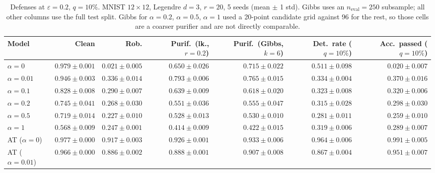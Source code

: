 \begin{table}[htbp]
  \centering
  \small
  \begin{tabular}{@{}lrrrrrr@{}}
    \toprule
    Model & Clean & Rob. & Purif.\ (lk., $r{=}0.2$) & Purif.\ (Gibbs, $k{=}6$) & Det.\ rate ($q{=}10\%$) & Acc.\ passed ($q{=}10\%$) \\
    \midrule
    $\alpha{=}0$ & $\mathbf{0.979 \pm 0.001}$ & $0.021 \pm 0.005$ & $0.650 \pm 0.026$ & $0.715 \pm 0.022$ & $0.511 \pm 0.098$ & $0.020 \pm 0.007$ \\
    $\alpha{=}0.01$ & $0.946 \pm 0.003$ & $0.336 \pm 0.014$ & $0.793 \pm 0.006$ & $0.765 \pm 0.015$ & $0.334 \pm 0.004$ & $0.370 \pm 0.016$ \\
    $\alpha{=}0.1$ & $0.828 \pm 0.008$ & $0.290 \pm 0.007$ & $0.639 \pm 0.009$ & $0.618 \pm 0.020$ & $0.323 \pm 0.008$ & $0.320 \pm 0.006$ \\
    $\alpha{=}0.2$ & $0.745 \pm 0.041$ & $0.268 \pm 0.030$ & $0.551 \pm 0.036$ & $0.555 \pm 0.047$ & $0.315 \pm 0.028$ & $0.298 \pm 0.030$ \\
    $\alpha{=}0.5$ & $0.719 \pm 0.014$ & $0.227 \pm 0.010$ & $0.528 \pm 0.013$ & $0.530 \pm 0.010$ & $0.281 \pm 0.011$ & $0.259 \pm 0.010$ \\
    $\alpha{=}1$ & $0.568 \pm 0.009$ & $0.247 \pm 0.001$ & $0.414 \pm 0.009$ & $0.422 \pm 0.015$ & $0.319 \pm 0.006$ & $0.289 \pm 0.007$ \\
    AT ($\alpha{=}0$) & $0.977 \pm 0.000$ & $\mathbf{0.917 \pm 0.003}$ & $\mathbf{0.926 \pm 0.001}$ & $\mathbf{0.933 \pm 0.006}$ & $\mathbf{0.964 \pm 0.006}$ & $\mathbf{0.991 \pm 0.005}$ \\
    AT ($\alpha{=}0.01$) & $0.966 \pm 0.000$ & $0.886 \pm 0.002$ & $0.888 \pm 0.001$ & $0.907 \pm 0.008$ & $0.867 \pm 0.004$ & $0.951 \pm 0.007$ \\
    \bottomrule
  \end{tabular}
  \caption{Defenses at $\varepsilon=0.2$, $q{=}10\%$. MNIST $12\times12$, Legendre $d{=}3$, $r{=}20$, 5 seeds (mean $\pm$ 1 std). Gibbs uses an $n_{\mathrm{eval}}=250$ subsample; all other columns use the full test split. Gibbs for $\alpha{=}0.2$, $\alpha{=}0.5$, $\alpha{=}1$ used a 20-point candidate grid against 96 for the rest, so those cells are a coarser purifier and are not directly comparable.}
  \label{tab:mnist_r12_models_r20_eps0.2}
\end{table}
